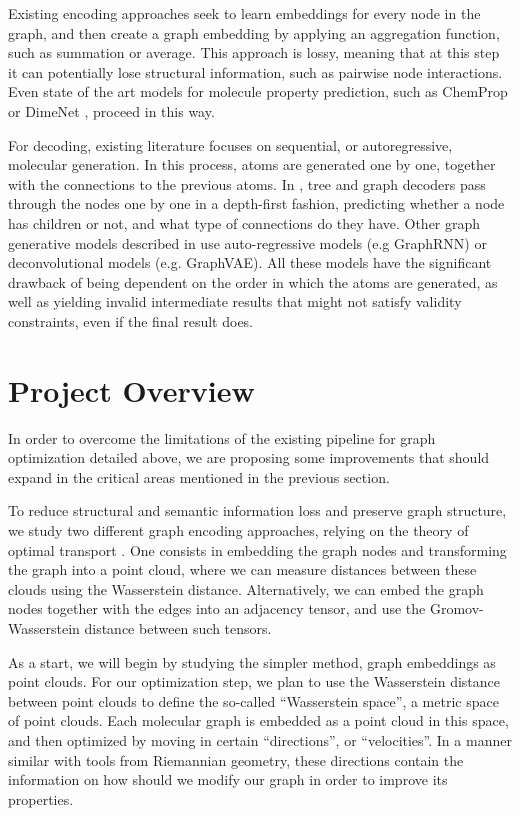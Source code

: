 \documentclass[11pt]{article}
\begin{document}
Existing encoding approaches seek to learn embeddings for every node in the graph, and then create a graph embedding by applying an aggregation function, such as summation or average. This approach is lossy, meaning that at this step it can potentially lose structural information, such as pairwise node interactions. Even state of the art models for molecule property prediction, such as ChemProp \cite{yang2019analyzing} or DimeNet \cite{Klicpera2020Directional}, proceed in this way.

For decoding, existing literature focuses on sequential, or autoregressive, molecular generation. In this process, atoms are generated one by one, together with the connections to the previous atoms. In \cite{DBLP:journals/corr/abs-1802-04364,DBLP:journals/corr/abs-1812-01070,jin2020hierarchical, jin2019hierarchical}, tree and graph decoders pass through the nodes one by one in a depth-first fashion, predicting whether a node has children or not, and what type of connections do they have. Other graph generative models described in \cite{DBLP:journals/corr/abs-1901-00596} use auto-regressive models (e.g GraphRNN) or deconvolutional models (e.g. GraphVAE). All these models have the significant drawback of being dependent on the order in which the atoms are generated, as well as yielding invalid intermediate results that might not satisfy validity constraints, even if the final result does.

\section{Project Overview}
In order to overcome the limitations of the existing pipeline for graph optimization detailed above, we are proposing some improvements that should expand in the critical areas mentioned in the previous section.

To reduce structural and semantic information loss and preserve graph structure, we study two different graph encoding approaches, relying on the theory of optimal transport \cite{vayer2018optimal}. One consists in embedding the graph nodes and transforming the graph into a point cloud, where we can measure distances between these clouds using the Wasserstein distance. Alternatively, we can embed the graph nodes together with the edges into an adjacency tensor, and use the Gromov-Wasserstein distance between such tensors.

As a start, we will begin by studying the simpler method, graph embeddings as point clouds. For our optimization step, we plan to use the Wasserstein distance between point clouds to define the so-called “Wasserstein space”, a metric space of point clouds. Each molecular graph is embedded as a point cloud in this space, and then optimized by moving in certain “directions”, or “velocities”. In a manner similar with tools from Riemannian geometry, these directions contain the information on how should we modify our graph in order to improve its properties. 
\end{document}

